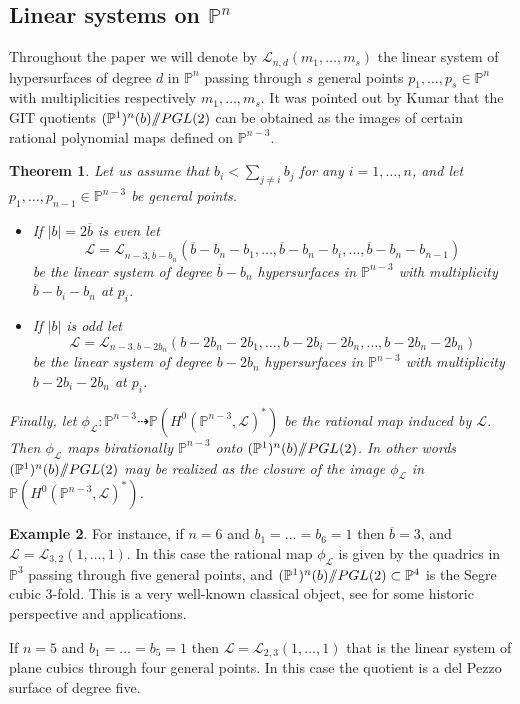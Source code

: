 \documentclass[a4paper,10pt]{amsart}
\newtheorem{thm}{Theorem}[section]
\theoremstyle{definition}
\newtheorem{Example}[thm]{Example}
\renewcommand{\P}{\mathbb{P}}
\newcommand{\quot}{/\hspace{-1.2mm}/}
\begin{document}
\subsection{Linear systems on $\mathbb{P}^n$}
Throughout the paper we will denote by $\mathcal{L}_{n,d}(m_1,\dots,m_s)$  the linear system of hypersurfaces of degree $d$ in $\mathbb{P}^n$ passing through $s$ general points $p_1,\dots,p_s\in\mathbb{P}^n$ with multiplicities respectively $m_1,\dots,m_s$. It was pointed out by Kumar \cite[Section 3.3]{Ku03} that the GIT quotients $(\mathbb{P}^1)^n(b)\quot PGL(2)$ can be obtained as the images of certain rational polynomial maps defined on $\P^{n-3}$.

\begin{thm}\cite[Theorem 3.4]{Ku03}\label{Kum}
Let us assume that $b_i < \sum_{j\neq i}b_j$ for any $i=1,\dots,n$, and let $p_1,\dots,p_{n-1}\in\mathbb{P}^{n-3}$ be general points. 
\begin{itemize}
\item[-] If $|b| = 2\overline{b}$ is even let 
$$\mathcal{L}=\mathcal{L}_{n-3,\overline{b}-b_n}(\overline{b}-b_n-b_1,\dots,\overline{b}-b_n-b_i,\dots,\overline{b}-b_n-b_{n-1})$$ 
be the linear system of degree $\overline{b}-b_n$ hypersurfaces in $\mathbb{P}^{n-3}$ with multiplicity $\overline{b}-b_i-b_n$ at $p_i$. 
\item[-] If $|b|$ is odd let 
$$\mathcal{L}=\mathcal{L}_{n-3,b-2b_n}(b-2b_n-2b_1,\dots,b-2b_i-2b_n,\dots, b-2b_n-2b_n)$$ 
be the linear system of degree $b-2b_n$ hypersurfaces in $\mathbb{P}^{n-3}$ with multiplicity $b-2b_i-2b_n$ at $p_i$. 
\end{itemize}
Finally, let $\phi_{\mathcal{L}}:\mathbb{P}^{n-3}\dasharrow \mathbb{P}(H^0(\mathbb{P}^{n-3},\mathcal{L})^{*})$ be the rational map induced by $\mathcal{L}$. Then $\phi_{\mathcal{L}}$ maps birationally $\mathbb{P}^{n-3}$ onto $(\mathbb{P}^1)^n(b)\quot PGL(2)$. In other words $(\mathbb{P}^1)^n(b)\quot PGL(2)$ may be realized as the closure of the image $\phi_{\mathcal{L}}$ in $\mathbb{P}(H^0(\mathbb{P}^{n-3},\mathcal{L})^{*})$.
\end{thm}

\begin{Example}
For instance, if $n=6$ and $b_1=\dots=b_6=1$ then $\overline{b} = 3$, and $\mathcal{L}=\mathcal{L}_{3,2}(1,\dots,1)$. In this case the rational map $\phi_{\mathcal{L}}$ is given by the quadrics in $\mathbb{P}^3$ passing through five general points, and $(\mathbb{P}^1)^n(b)\quot PGL(2)\subset\mathbb{P}^4$ is the Segre cubic $3$-fold. This is a very well-known classical object, see \cite{Do15,AB15,BB12} for some historic perspective and applications.

If $n=5$ and $b_1=\dots=b_5=1$ then $\mathcal{L}=\mathcal{L}_{2,3}(1,\dots,1)$ that is the linear system of plane cubics through four general points. In this case the quotient is a del Pezzo surface of degree five.
\end{Example}
\end{document}
